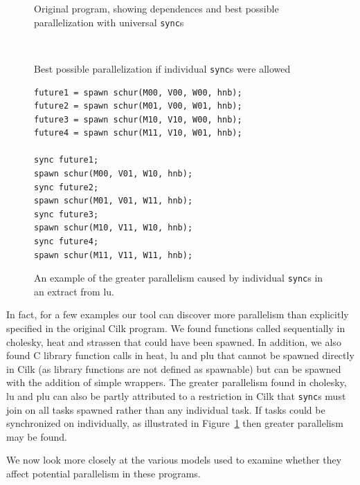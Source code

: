 \begin{figure}
  \begin{center}
  \small
  \begin{SubFloat}{\label{cilk-sync:without}Original program, showing dependences and best possible parallelization with universal \texttt{sync}s}
    \begin{minipage}{3in}
      
    \end{minipage}%
  \end{SubFloat}%
\\
  \begin{SubFloat}{\label{cilk-sync:with}Best possible parallelization if individual \texttt{sync}s were allowed}
    \begin{minipage}{3in}
      \begin{verbatim}
future1 = spawn schur(M00, V00, W00, hnb);
future2 = spawn schur(M01, V00, W01, hnb);
future3 = spawn schur(M10, V10, W00, hnb);
future4 = spawn schur(M11, V10, W01, hnb);

sync future1;
spawn schur(M00, V01, W10, hnb);
sync future2;
spawn schur(M01, V01, W11, hnb);
sync future3;
spawn schur(M10, V11, W10, hnb);
sync future4;
spawn schur(M11, V11, W11, hnb);
      \end{verbatim}
    \end{minipage}%
  \end{SubFloat}%
  \end{center}
  \caption{An example of the greater parallelism caused by individual \texttt{sync}s in an extract from lu.}
  \label{cilk-sync}
\end{figure}


In fact, for a few examples our tool can discover more parallelism than explicitly specified in the original Cilk program.
We found functions called sequentially in cholesky, heat and strassen that could have been spawned.
In addition, we also found C library function calls in heat, lu and plu that cannot be spawned directly in Cilk (as library functions are not defined as spawnable) but can be spawned with the addition of simple wrappers.
The greater parallelism found in cholesky, lu and plu can also be partly attributed to a restriction in Cilk that \texttt{sync}s must join on all tasks spawned rather than any individual task.
If tasks could be synchronized on individually, as illustrated in Figure~\ref{cilk-sync} then greater parallelism may be found.

We now look more closely at the various models used to examine whether they affect potential parallelism in these programs.

